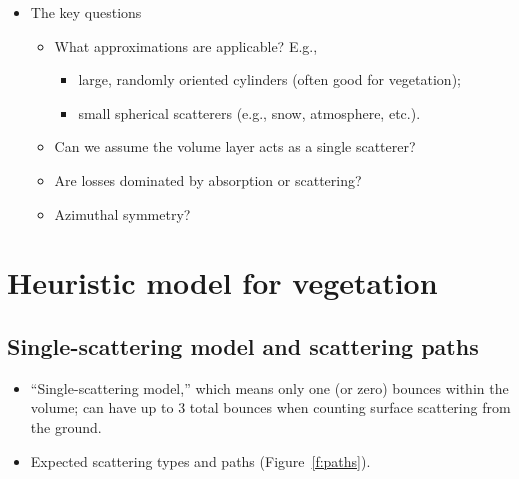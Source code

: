 \documentclass[11pt, oneside]{article}
\begin{document}
\begin{itemize}
\begin{itemize}
		\begin{itemize}
			\item large scatterers will be treated differently from small scatterers;
		\end{itemize}
		\item orientation of scatterers;
		\item shape distribution of scatterers;
		\item dielectric contrast between scatterers and background material.
	\end{itemize}
	\item The key questions
	\begin{itemize}
		\item What approximations are applicable? E.g.,
		\begin{itemize}
			\item large, randomly oriented cylinders (often good for vegetation);
			\item small spherical scatterers (e.g., snow, atmosphere, etc.).
		\end{itemize}
		\item Can we assume the volume layer acts as a single scatterer?
		\item Are losses dominated by absorption or scattering?
		\item Azimuthal symmetry?
	\end{itemize}
\end{itemize}

\section{Heuristic model for vegetation}
\label{s:veg}

\subsection{Single-scattering model and scattering paths}

\begin{itemize}
	\item ``Single-scattering model,'' which means only one (or zero) bounces within the volume; can have up to 3 total bounces when counting surface scattering from the ground.
	\item Expected scattering types and paths (Figure~\ref{f:paths}).
\end{itemize}
\end{document}
